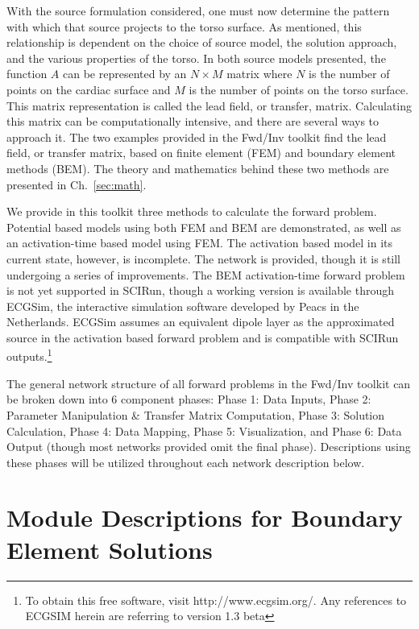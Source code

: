 With the source formulation considered, one must now determine the pattern with which that source projects to the torso surface. As mentioned, this relationship is dependent on the choice of source model, the solution approach, and the various properties of the torso. In both source models presented, the function $A$ can be represented by an $N \times M$ matrix where $N$ is the number of points on the cardiac surface and $M$ is the number of points on the torso surface.  This matrix representation is called the lead field, or transfer, matrix. Calculating this matrix can be computationally intensive, and there are several ways to approach it. The two examples provided in the Fwd/Inv toolkit find the lead field, or transfer matrix, based on finite element (FEM) and boundary element methods (BEM). The theory and mathematics behind these two methods are presented in Ch.~\ref{sec:math}.

We provide in this toolkit three methods to calculate the forward problem. Potential based models using both FEM and BEM are demonstrated, as well as an activation-time based model using FEM.
The activation based model in its current state, however, is incomplete.
The network is provided, though it is still undergoing a series of improvements.
The BEM activation-time forward problem is not yet supported in SCIRun, though a working version is available through ECGSim, the interactive simulation software developed by Peacs in the Netherlands. ECGSim assumes an equivalent dipole layer as the approximated source in the activation based forward problem and is compatible with SCIRun outputs.\footnote{To obtain this free software, visit http://www.ecgsim.org/. Any references to ECGSIM herein are referring to version 1.3 beta}

The general network structure of all forward problems in the Fwd/Inv toolkit can be broken down into 6 component phases: Phase 1: Data Inputs, Phase 2: Parameter Manipulation \& Transfer Matrix Computation, Phase 3: Solution Calculation, Phase 4: Data Mapping, Phase 5: Visualization, and Phase 6: Data Output (though most networks provided omit the final phase).
Descriptions using these phases will be utilized throughout each network description below.

\section{Module Descriptions for Boundary Element Solutions}

